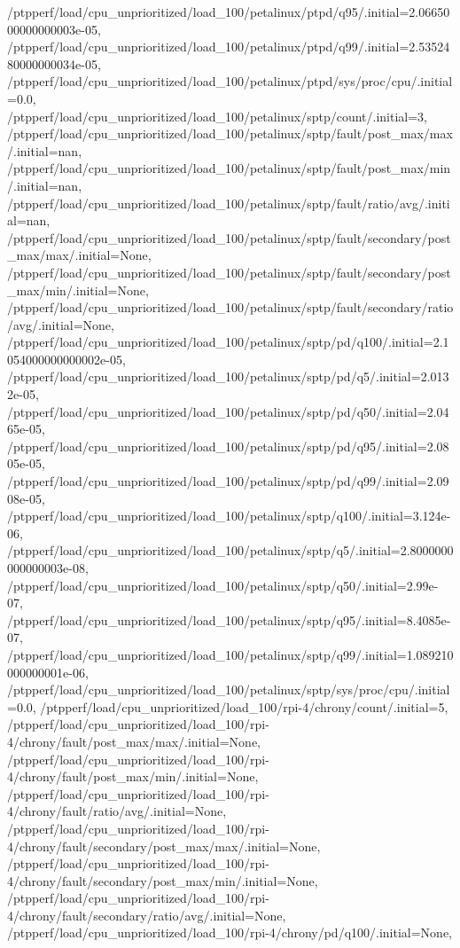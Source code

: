 {    /ptpperf/load/cpu_unprioritized/load_100/petalinux/ptpd/q95/.initial=2.0665000000000003e-05,
    /ptpperf/load/cpu_unprioritized/load_100/petalinux/ptpd/q99/.initial=2.5352480000000034e-05,
    /ptpperf/load/cpu_unprioritized/load_100/petalinux/ptpd/sys/proc/cpu/.initial=0.0,
    /ptpperf/load/cpu_unprioritized/load_100/petalinux/sptp/count/.initial=3,
    /ptpperf/load/cpu_unprioritized/load_100/petalinux/sptp/fault/post_max/max/.initial=nan,
    /ptpperf/load/cpu_unprioritized/load_100/petalinux/sptp/fault/post_max/min/.initial=nan,
    /ptpperf/load/cpu_unprioritized/load_100/petalinux/sptp/fault/ratio/avg/.initial=nan,
    /ptpperf/load/cpu_unprioritized/load_100/petalinux/sptp/fault/secondary/post_max/max/.initial=None,
    /ptpperf/load/cpu_unprioritized/load_100/petalinux/sptp/fault/secondary/post_max/min/.initial=None,
    /ptpperf/load/cpu_unprioritized/load_100/petalinux/sptp/fault/secondary/ratio/avg/.initial=None,
    /ptpperf/load/cpu_unprioritized/load_100/petalinux/sptp/pd/q100/.initial=2.1054000000000002e-05,
    /ptpperf/load/cpu_unprioritized/load_100/petalinux/sptp/pd/q5/.initial=2.0132e-05,
    /ptpperf/load/cpu_unprioritized/load_100/petalinux/sptp/pd/q50/.initial=2.0465e-05,
    /ptpperf/load/cpu_unprioritized/load_100/petalinux/sptp/pd/q95/.initial=2.0805e-05,
    /ptpperf/load/cpu_unprioritized/load_100/petalinux/sptp/pd/q99/.initial=2.0908e-05,
    /ptpperf/load/cpu_unprioritized/load_100/petalinux/sptp/q100/.initial=3.124e-06,
    /ptpperf/load/cpu_unprioritized/load_100/petalinux/sptp/q5/.initial=2.8000000000000003e-08,
    /ptpperf/load/cpu_unprioritized/load_100/petalinux/sptp/q50/.initial=2.99e-07,
    /ptpperf/load/cpu_unprioritized/load_100/petalinux/sptp/q95/.initial=8.4085e-07,
    /ptpperf/load/cpu_unprioritized/load_100/petalinux/sptp/q99/.initial=1.089210000000001e-06,
    /ptpperf/load/cpu_unprioritized/load_100/petalinux/sptp/sys/proc/cpu/.initial=0.0,
    /ptpperf/load/cpu_unprioritized/load_100/rpi-4/chrony/count/.initial=5,
    /ptpperf/load/cpu_unprioritized/load_100/rpi-4/chrony/fault/post_max/max/.initial=None,
    /ptpperf/load/cpu_unprioritized/load_100/rpi-4/chrony/fault/post_max/min/.initial=None,
    /ptpperf/load/cpu_unprioritized/load_100/rpi-4/chrony/fault/ratio/avg/.initial=None,
    /ptpperf/load/cpu_unprioritized/load_100/rpi-4/chrony/fault/secondary/post_max/max/.initial=None,
    /ptpperf/load/cpu_unprioritized/load_100/rpi-4/chrony/fault/secondary/post_max/min/.initial=None,
    /ptpperf/load/cpu_unprioritized/load_100/rpi-4/chrony/fault/secondary/ratio/avg/.initial=None,
    /ptpperf/load/cpu_unprioritized/load_100/rpi-4/chrony/pd/q100/.initial=None,
}

